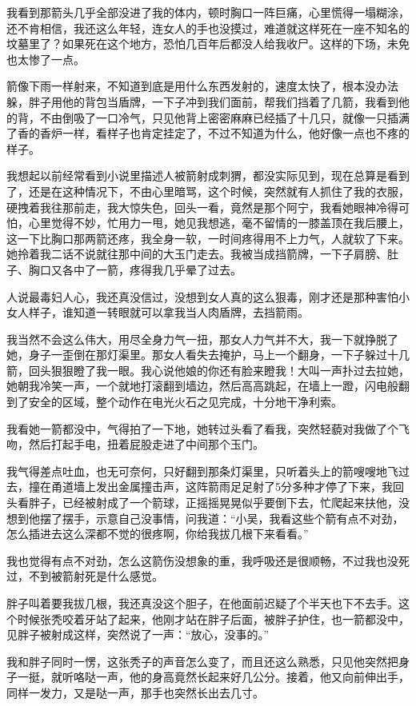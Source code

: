 我看到那箭头几乎全部没进了我的体内，顿时胸口一阵巨痛，心里慌得一塌糊涂，还不肯相信，我还这么年轻，连女人的手也没摸过，难道就这样死在一座不知名的坟墓里了？如果死在这个地方，恐怕几百年后都没人给我收尸。这样的下场，未免也太惨了一点。

箭像下雨一样射来，不知道到底是用什么东西发射的，速度太快了，根本没办法躲，胖子用他的背包当盾牌，一下子冲到我们面前，帮我们挡着了几箭，我看到他的背，不由倒吸了一口冷气，只见他背上密密麻麻已经插了十几只，就像一只插满了香的香炉一样，看样子也肯定挂定了，不过不知道为什么，他好像一点也不疼的样子。

我想起以前经常看到小说里描述人被箭射成刺猬，都没实际见到，现在总算是看到了，还是在这种情况下，不由心里暗骂，这个时候，突然就有人抓住了我的衣服，硬拽着我往那前走，我大惊失色，回头一看，竟然是那个阿宁，我看她眼神冷得可怕，心里觉得不妙，忙用力一甩，她见我想逃，毫不留情的一膝盖顶在我后腰上，这一下比胸口那两箭还疼，我全身一软，一时间疼得用不上力气，人就软了下来。她拎着我二话不说就往那中间的大玉门走去。我被当成挡箭牌，一下子肩膀、肚子、胸口又各中了一箭，疼得我几乎晕了过去。

人说最毒妇人心，我还真没信过，没想到女人真的这么狠毒，刚才还是那种害怕小女人样子，谁知道一转眼就可以拿我当人肉盾牌，去挡箭雨。

我当然不会这么伟大，用尽全身力气一扭，那女人力气并不大，我一下就挣脱了她，身子一歪倒在那灯渠里。那女人看失去掩护，马上一个翻身，一下子躲过十几箭，回头狠狠瞪了我一眼。我心说他娘的你还有脸来瞪我！大叫一声扑过去拉她，她朝我冷笑一声，一个就地打滚翻到墙边，然后高高跳起，在墙上一蹬，闪电般翻到了安全的区域，整个动作在电光火石之见完成，十分地干净利索。

我看她一箭都没中，气得拍了一下地，她转过头看了看我，突然轻藐对我做了个飞吻，然后打起手电，扭着屁股走进了中间那个玉门。

我气得差点吐血，也无可奈何，只好翻到那条灯渠里，只听着头上的箭嗖嗖地飞过去，撞在甬道墙上发出金属撞击声，这阵箭雨足足射了5分多种才停了下来，我回头看胖子，已经被射成了一个箭球，正摇摇晃晃似乎要倒下去，忙爬起来扶他，没想到他摆了摆手，示意自己没事情，问我道：“小吴，我看这些个箭有点不对劲，怎么插进去这么深都不觉的很疼啊，你给我拔几根下来看看。”

我也觉得有点不对劲，怎么这箭伤没想象的重，我呼吸还是很顺畅，不过我也没死过，不到被箭射死是什么感觉。

胖子叫着要我拔几根，我还真没这个胆子，在他面前迟疑了个半天也下不去手。这个时候张秃咬着牙站了起来，他刚才站在胖子后面，被胖子护住，也一箭都没中，见胖子被射成这样，突然说了一声：“放心，没事的。”

我和胖子同时一愣，这张秃子的声音怎么变了，而且还这么熟悉，只见他突然把身子一挺，就听咯哒一声，他的身高竟然长起来好几公分。接着，他又向前伸出手，同样一发力，又是哒一声，那手也突然长出去几寸。


